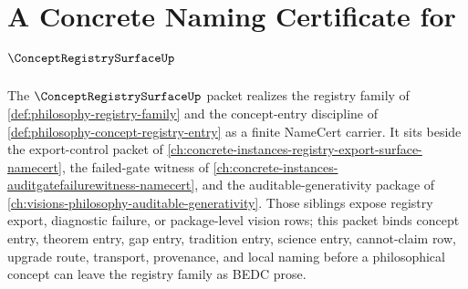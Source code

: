 \chapter{A Concrete Naming Certificate for $\ConceptRegistrySurfaceUp$}
\label{ch:concrete-instances-concept-registry-surface-namecert}

The $\ConceptRegistrySurfaceUp$ packet realizes the registry family of \autoref{def:philosophy-registry-family} and the concept-entry discipline of \autoref{def:philosophy-concept-registry-entry} as a finite NameCert carrier. It sits beside the export-control packet of \autoref{ch:concrete-instances-registry-export-surface-namecert}, the failed-gate witness of \autoref{ch:concrete-instances-auditgatefailurewitness-namecert}, and the auditable-generativity package of \autoref{ch:visions-philosophy-auditable-generativity}. Those siblings expose registry export, diagnostic failure, or package-level vision rows; this packet binds concept entry, theorem entry, gap entry, tradition entry, science entry, cannot-claim row, upgrade route, transport, provenance, and local naming before a philosophical concept can leave the registry family as BEDC prose.


